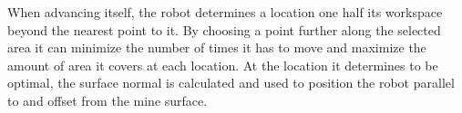 When advancing itself, the robot determines a location one half its workspace beyond the nearest point to it. By choosing a point further along the selected area it can minimize the number of times it has to move and maximize the amount of area it covers at each location. At the location it determines to be optimal, the surface normal is calculated and used to position the robot parallel to and offset from the mine surface.\\
